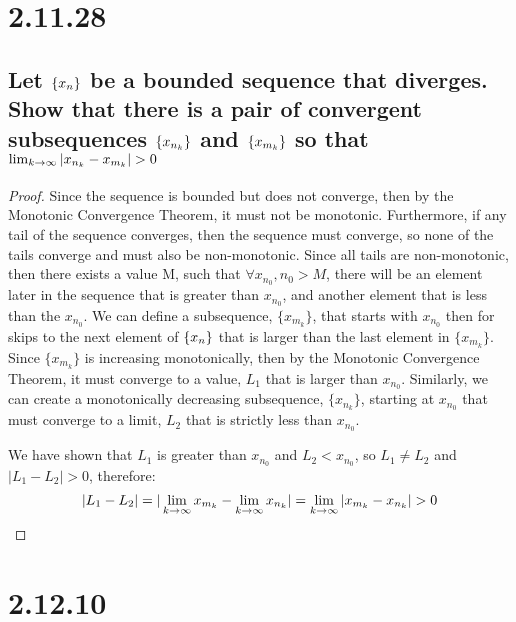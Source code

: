 \documentclass[11pt]{article}
\begin{document}
	\def \theseq {\{\xn\}}
	\def \subeleone {x_{m_k}}
	\def \subeletwo {x_{n_k}}
	\def \subseqone {\{\subeleone\}}
	\def \subseqtwo {\{x_{n_k}\}}
	\def \startofsubseq {x_{n_0}}
	
	\section*{2.11.28}
	\subsection*{Let $\{x_n\}$ be a bounded sequence that diverges. Show that there is a pair of convergent subsequences $\{x_{n_k}\}$ and $\{x_{m_k}\}$ so that $\lim_{k \to \infty}|x_{n_k} - x_{m_k}| > 0$}
	
	\begin{proof}
				
		Since the sequence is bounded but does not converge, then by the Monotonic Convergence Theorem, it must not be monotonic. Furthermore, if any tail of the sequence converges, then the sequence must converge, so none of the tails converge and must also be non-monotonic. Since all tails are non-monotonic, then there exists a value M, such that $\forall \startofsubseq, n_0 > M$, there will be an element later in the sequence that is greater than $\startofsubseq$, and another element that is less than the $\startofsubseq$. We can define a subsequence, $\subseqone$, that starts with $\startofsubseq$ then for skips to the next element of $\theseq$ that is larger than the last element in $\subseqone$. Since $\subseqone$ is increasing monotonically, then by the Monotonic Convergence Theorem, it must converge to a value, $L_1$ that is larger than $\startofsubseq$. Similarly, we can create a monotonically decreasing subsequence, $\subseqtwo$, starting at $\startofsubseq$ that must converge to a limit, $L_2$ that is strictly less than $\startofsubseq$. 
				 
		 We have shown that $L_1$ is greater than $\startofsubseq$ and $L_2 < \startofsubseq$, so  $L_1 \ne L_2$ and $|L_1 - L_2| > 0$, therefore:
		 	 $$|L_1 - L_2| = |\limittoinfy{k}{\subeleone} - \limittoinfy{k}{\subeletwo}| = \limittoinfy{k}{|\subeleone - \subeletwo|} > 0$$
				
	\end{proof}

	\section*{2.12.10}
	
\end{document}
